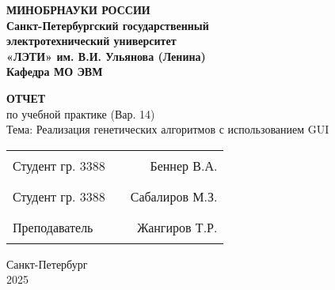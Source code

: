 \documentclass[nocolor, 12pt]{report}
\begin{document}
    \begin{titlepage}

        \thispagestyle{empty}
        
        \begin{center}\bf\Large{
            МИНОБРНАУКИ РОССИИ\\
            Санкт-Петербургский государственный\\
            электротехнический университет\\
            «ЛЭТИ» им. В.И. Ульянова (Ленина)\\
            Кафедра МО ЭВМ}
        \end{center}

        \vfill
        \begin{center}
            \Large{\bf ОТЧЕТ}\\
            \large{по учебной практике (Вар. 14)}\\
            \large{Тема: Реализация генетических алгоритмов с использованием GUI}
        \end{center}

        \vfill
        \vfill
        \noindent
        \begin{tabular}{l p{} r}
        Студент гр. 3388 & \hfill\rule{4cm}{0.4pt} & Беннер В.А. \\
        Студент гр. 3388 & \hfill\rule{4cm}{0.4pt} & Сабалиров М.З. \\
        Преподаватель    & \hfill\rule{4cm}{0.4pt} & Жангиров Т.Р. \\
        \end{tabular}
        \vfill

        \begin{center}
            Санкт-Петербург\\2025
        \end{center}
        \clearpage
    \end{titlepage}
    \tableofcontents
    
    
    
\end{document}
